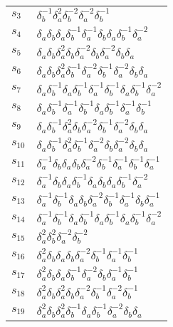 \documentclass{article}
\begin{document}
\begin{center}
\begin{tabular}{ll}
$s_{3}$ & $\delta_b^{-1}\delta_a^{2}\delta_b^{-2}\delta_a^{-2}\delta_b^{-1}$ \\
$s_{4}$ & $\delta_a^{}\delta_b^{}\delta_a^{}\delta_b^{-1}\delta_a^{-1}\delta_b^{}\delta_a^{}\delta_b^{-1}\delta_a^{-2}$ \\
$s_{5}$ & $\delta_a^{}\delta_b^{}\delta_a^{2}\delta_b^{}\delta_a^{-2}\delta_b^{}\delta_a^{-2}\delta_b^{}\delta_a^{}$ \\
$s_{6}$ & $\delta_a^{}\delta_b^{}\delta_a^{2}\delta_b^{-1}\delta_a^{-2}\delta_b^{-1}\delta_a^{-2}\delta_b^{}\delta_a^{}$ \\
$s_{7}$ & $\delta_a^{}\delta_b^{-1}\delta_a^{}\delta_b^{-1}\delta_a^{-1}\delta_b^{-1}\delta_a^{}\delta_b^{-1}\delta_a^{-2}$ \\
$s_{8}$ & $\delta_a^{}\delta_b^{-1}\delta_a^{-1}\delta_b^{-1}\delta_a^{}\delta_b^{-1}\delta_a^{-1}\delta_b^{-1}$ \\
$s_{9}$ & $\delta_a^{}\delta_b^{-1}\delta_a^{2}\delta_b^{}\delta_a^{-2}\delta_b^{-1}\delta_a^{-2}\delta_b^{}\delta_a^{}$ \\
$s_{10}$ & $\delta_a^{}\delta_b^{-1}\delta_a^{2}\delta_b^{-1}\delta_a^{-2}\delta_b^{}\delta_a^{-2}\delta_b^{}\delta_a^{}$ \\
$s_{11}$ & $\delta_a^{-1}\delta_b^{}\delta_a^{}\delta_b^{}\delta_a^{-2}\delta_b^{-1}\delta_a^{-1}\delta_b^{-1}\delta_a^{-1}$ \\
$s_{12}$ & $\delta_a^{-1}\delta_b^{}\delta_a^{}\delta_b^{-1}\delta_a^{}\delta_b^{}\delta_a^{}\delta_b^{-1}\delta_a^{-2}$ \\
$s_{13}$ & $\delta_a^{-1}\delta_b^{-1}\delta_a^{}\delta_b^{}\delta_a^{-2}\delta_b^{-1}\delta_a^{-1}\delta_b^{}\delta_a^{-1}$ \\
$s_{14}$ & $\delta_a^{-1}\delta_b^{-1}\delta_a^{}\delta_b^{-1}\delta_a^{}\delta_b^{-1}\delta_a^{}\delta_b^{-1}\delta_a^{-2}$ \\
$s_{15}$ & $\delta_a^{2}\delta_b^{2}\delta_a^{-2}\delta_b^{-2}$ \\
$s_{16}$ & $\delta_a^{2}\delta_b^{}\delta_a^{}\delta_b^{}\delta_a^{-2}\delta_b^{-1}\delta_a^{-1}\delta_b^{-1}$ \\
$s_{17}$ & $\delta_a^{2}\delta_b^{}\delta_a^{}\delta_b^{-1}\delta_a^{-2}\delta_b^{}\delta_a^{-1}\delta_b^{-1}$ \\
$s_{18}$ & $\delta_a^{2}\delta_b^{}\delta_a^{2}\delta_b^{}\delta_a^{-2}\delta_b^{-1}\delta_a^{-2}\delta_b^{-1}$ \\
$s_{19}$ & $\delta_a^{2}\delta_b^{}\delta_a^{2}\delta_b^{-1}\delta_a^{}\delta_b^{-1}\delta_a^{-2}\delta_b^{}\delta_a^{}$ \\

\end{tabular}
\end{center}
\end{document}
